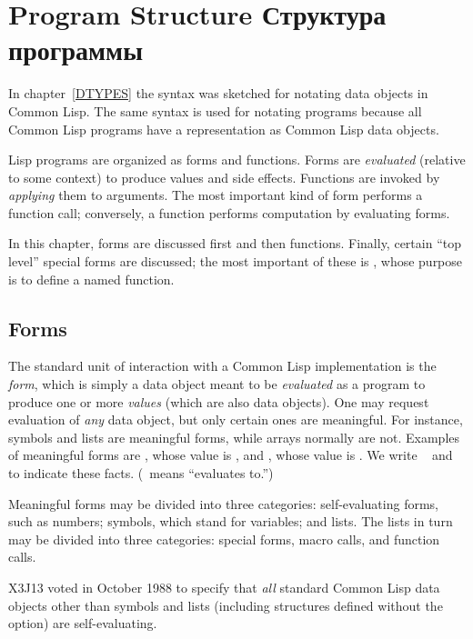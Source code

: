 
\clearpage\def\pagestatus{FINAL PROOF}

\ifx \rulang\Undef
\chapter{Program Structure Структура программы}
\label{PROGS}

In chapter~\ref{DTYPES} the syntax was sketched for notating data objects
in Common Lisp.  The same syntax is used for notating programs because all
Common Lisp programs have a representation as Common Lisp data objects.

Lisp programs are organized as forms and functions.  Forms are
\emph{evaluated} (relative to some context) to produce values and side
effects.  Functions are invoked by \emph{applying} them to arguments.
The most important kind of form performs a function call;
conversely, a function performs computation by evaluating forms.

In this chapter, forms are discussed first and then functions.
Finally, certain ``top level'' special forms are discussed; the most
important of these is , whose purpose is to define a
named function.

\section{Forms}

The standard unit of interaction with a Common Lisp implementation is the \emph{form},
which is simply a data object meant to be \emph{evaluated} as a program
to produce one or more \emph{values} (which are also data objects).
One may request evaluation of \emph{any} data object, but only certain ones
are meaningful.  For instance,
symbols and lists are meaningful forms, while arrays
normally are not.  Examples of meaningful forms are ,
whose value is , and , whose value is .
We write  \EV\  and  \EV\ 
to indicate these facts.  (\EV\ means ``evaluates to.'')

Meaningful forms may be divided into three categories:
self-evaluating forms, such as numbers; symbols, which stand
for variables; and lists.  The lists in turn may be divided
into three categories: special forms, macro calls, and function calls.

\begin{newer}
X3J13 voted in October 1988  to specify that
\emph{all} standard Common Lisp data objects other than symbols
and lists (including  structures defined
without the  option) are self-evaluating.
\end{newer}

